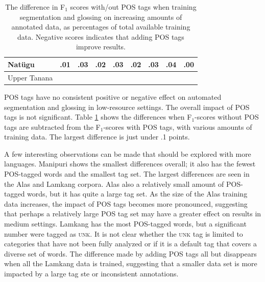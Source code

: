 \begin{table}[b]
\begin{tabular}{l|cccccccc}
       Nat\"ugu & .01 & .03 & .02 & .03 & .02 & .03 & .04 & .00 \\
       \hline
       Upper Tanana &  &  &  &  &  &  &  &  \\
    \end{tabular}
    \caption[Segmenting and Glossing with/out POS tags]{The difference in F$_1$ scores with/out POS tags when training segmentation and glossing on increasing amounts of annotated data, as percentages of total available training data. Negative scores indicates that adding POS tags improve results.
    }
    \label{tab:POSSG}
\end{table}

POS tags have no consistent positive or negative effect on automated segmentation and glossing in low-resource settings. The overall impact of POS tags is not significant. Table \ref{tab:POSSG} shows the differences when F$_1$-scores without POS tags are subtracted from the F$_1$-scores with POS tags, with various amounts of training data. The largest difference is just under .1 points. 

A few interesting observations can be made that should be explored with more languages. Manipuri shows the smallest differences overall; it also has the fewest POS-tagged words and the smallest tag set. The largest differences are seen in the Alas and Lamkang corpora. Alas also a relatively small amount of POS-tagged words, but it has quite a large tag set. As the size of the Alas training data increases, the impact of POS tags becomes more pronounced, suggesting that perhaps a relatively large POS tag set may have a greater effect on results in medium settings. Lamkang has the most POS-tagged words, but a significant number were tagged as \textsc{unk}. It is not clear whether the \textsc{unk} tag is limited to categories that have not been fully analyzed or if it is a default tag that covers a diverse set of words. The difference made by adding POS tags all but disappears when all the Lamkang data is trained, suggesting that a smaller data set is more impacted by a large tag ste or inconsistent annotations.

